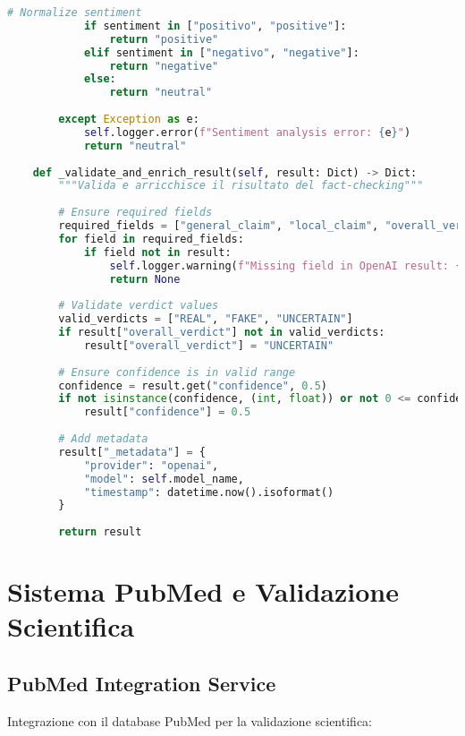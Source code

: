 \documentclass[12pt,a4paper]{report}
\begin{document}
\begin{lstlisting}[language=Python, caption=OpenAI Service Provider]
            # Normalize sentiment
            if sentiment in ["positivo", "positive"]:
                return "positive"
            elif sentiment in ["negativo", "negative"]:
                return "negative"
            else:
                return "neutral"
                
        except Exception as e:
            self.logger.error(f"Sentiment analysis error: {e}")
            return "neutral"
    
    def _validate_and_enrich_result(self, result: Dict) -> Dict:
        """Valida e arricchisce il risultato del fact-checking"""
        
        # Ensure required fields
        required_fields = ["general_claim", "local_claim", "overall_verdict", "confidence"]
        for field in required_fields:
            if field not in result:
                self.logger.warning(f"Missing field in OpenAI result: {field}")
                return None
        
        # Validate verdict values
        valid_verdicts = ["REAL", "FAKE", "UNCERTAIN"]
        if result["overall_verdict"] not in valid_verdicts:
            result["overall_verdict"] = "UNCERTAIN"
        
        # Ensure confidence is in valid range
        confidence = result.get("confidence", 0.5)
        if not isinstance(confidence, (int, float)) or not 0 <= confidence <= 1:
            result["confidence"] = 0.5
        
        # Add metadata
        result["_metadata"] = {
            "provider": "openai",
            "model": self.model_name,
            "timestamp": datetime.now().isoformat()
        }
        
        return result
\end{lstlisting}

\section{Sistema PubMed e Validazione Scientifica}

\subsection{PubMed Integration Service}

Integrazione con il database PubMed per la validazione scientifica:
\end{document}
